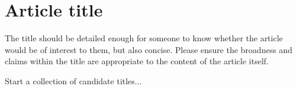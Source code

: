 \section*{Article title}
The title should be detailed enough for someone to know whether the article would be of interest to them, but also concise. Please ensure the broadness and claims within the title are appropriate to the content of the article itself.

Start a collection of candidate titles...